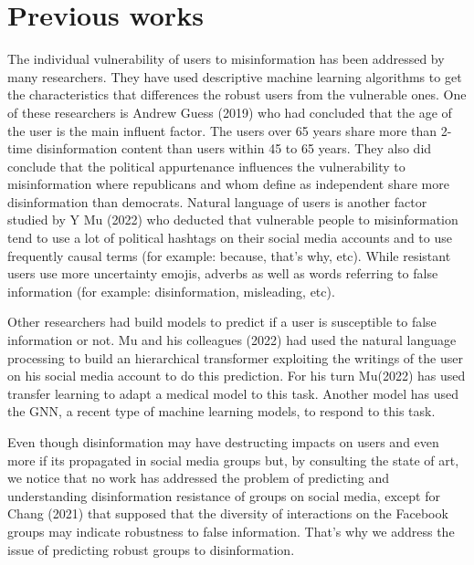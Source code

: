 \documentclass[12pt,sigconf,letterpaper,anonymous,nonacm]{acmart}
\begin{document}
\section{Previous works}
The individual vulnerability of users to misinformation has been addressed by many researchers. They have used descriptive machine learning algorithms to get the characteristics that differences the robust users from the vulnerable ones. One of these researchers is Andrew Guess (2019) \cite{11_rapp} who had concluded that the age of the user is the main influent factor. The users over 65 years share more than 2-time disinformation content than users within 45 to 65 years. They also did conclude that the political appurtenance influences the vulnerability to misinformation where republicans and whom define as independent share more disinformation than democrats. Natural language of users is another factor studied by Y Mu (2022) \cite{4} who deducted that vulnerable people to misinformation tend to use a lot of political hashtags on their social media accounts and to use frequently causal terms (for example: because, that’s why, etc). While resistant users use more uncertainty emojis, adverbs as well as words referring to false information (for example: disinformation, misleading, etc).\par
Other researchers had build models to predict if a user is susceptible to false information or not.  Mu and his colleagues (2022) \cite{6_rapp} had used the natural language processing to build an hierarchical transformer exploiting the writings of the user on his social media account to do this prediction. For his turn Mu(2022) \cite{29_rapp} has used transfer learning to adapt a medical model to this task. Another model has used the GNN, a recent type of machine learning models, to respond to this task. \par
Even though disinformation may have  destructing impacts on users and even more if its propagated in social media groups but, by consulting the state of art, we notice that no work has addressed the problem of predicting and understanding disinformation resistance of groups on social media, except for Chang (2021) \cite{6} that supposed that the diversity of interactions on the Facebook groups may indicate robustness to false information. That’s why we  address the issue of predicting robust groups to disinformation. 
\end{document}
